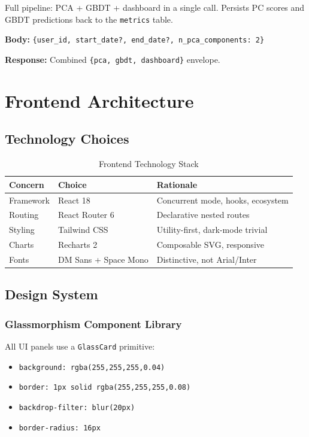 \documentclass[12pt,a4paper]{report}
\begin{document}
\begin{apibox}
Full pipeline: PCA + GBDT + dashboard in a single call.
Persists PC scores and GBDT predictions back to the \texttt{metrics} table.

\textbf{Body:} \texttt{\{user\_id, start\_date?, end\_date?, n\_pca\_components: 2\}}

\textbf{Response:} Combined \texttt{\{pca, gbdt, dashboard\}} envelope.
\end{apibox}

\chapter{Frontend Architecture}

\section{Technology Choices}

\begin{table}[h!]
\centering
\caption{Frontend Technology Stack}
\begin{tabular}{lll}
\toprule
\textbf{Concern} & \textbf{Choice} & \textbf{Rationale} \\
\midrule
Framework     & React 18      & Concurrent mode, hooks, ecosystem \\
Routing       & React Router 6 & Declarative nested routes \\
Styling       & Tailwind CSS  & Utility-first, dark-mode trivial \\
Charts        & Recharts 2    & Composable SVG, responsive \\
Fonts         & DM Sans + Space Mono & Distinctive, not Arial/Inter \\
\bottomrule
\end{tabular}
\end{table}

\section{Design System}

\subsection{Glassmorphism Component Library}

All UI panels use a \texttt{GlassCard} primitive:
\begin{itemize}
  \item \texttt{background: rgba(255,255,255,0.04)}
  \item \texttt{border: 1px solid rgba(255,255,255,0.08)}
  \item \texttt{backdrop-filter: blur(20px)}
  \item \texttt{border-radius: 16px}
\end{itemize}
\end{document}
